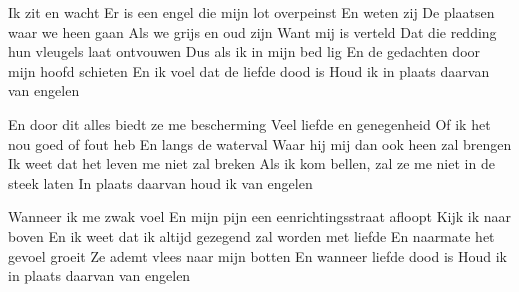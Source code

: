 \begin{verse*}
Ik zit en wacht 
Er is een engel die mijn lot overpeinst
En weten zij 
De plaatsen waar we heen gaan 
Als we grijs en oud zijn 
Want mij is verteld 
Dat die redding hun vleugels laat ontvouwen 
Dus als ik in mijn bed lig 
En de gedachten door mijn hoofd schieten 
En ik voel dat de liefde dood is 
Houd ik in plaats daarvan van engelen
\end{verse*}

\begin{chorus}
En door dit alles biedt ze me bescherming 
Veel liefde en genegenheid 
Of ik het nou goed of fout heb 
En langs de waterval 
Waar hij mij dan ook heen zal brengen 
Ik weet dat het leven me niet zal breken 
Als ik kom bellen, zal ze me niet in de steek laten 
In plaats daarvan houd ik van engelen
\end{chorus}

\begin{verse*}
Wanneer ik me zwak voel 
En mijn pijn een eenrichtingsstraat afloopt 
Kijk ik naar boven 
En ik weet dat ik altijd gezegend zal worden met liefde 
En naarmate het gevoel groeit 
Ze ademt vlees naar mijn botten 
En wanneer liefde dood is 
Houd ik in plaats daarvan van engelen
\end{verse*}

\thechorus[2]